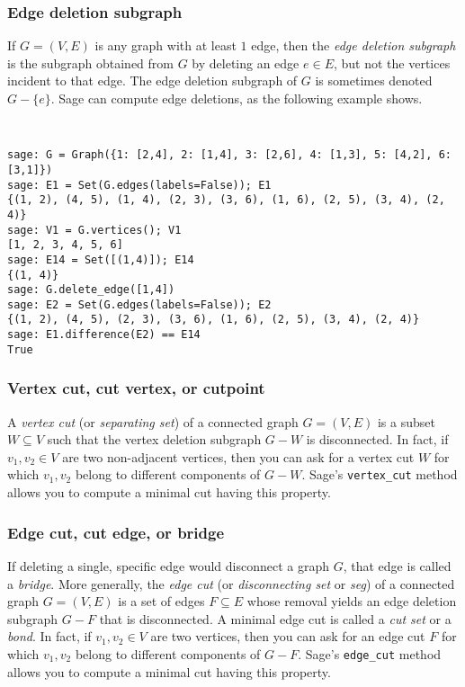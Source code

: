 \subsubsection{Edge deletion subgraph}

If $G = (V,E)$ is any graph with at least $1$ edge, then the
\emph{edge deletion subgraph} is the subgraph obtained from $G$ by
deleting an edge $e \in E$, but not the vertices incident to that edge.
The edge deletion subgraph of $G$ is sometimes denoted $G - \{e\}$.
Sage can compute edge deletions, as the following example shows.
%
\begin{center}
\fontsize{9pt}{9pt}
\selectfont
\tt
\begin{lstlisting}
sage: G = Graph({1: [2,4], 2: [1,4], 3: [2,6], 4: [1,3], 5: [4,2], 6: [3,1]})
sage: E1 = Set(G.edges(labels=False)); E1
{(1, 2), (4, 5), (1, 4), (2, 3), (3, 6), (1, 6), (2, 5), (3, 4), (2, 4)}
sage: V1 = G.vertices(); V1
[1, 2, 3, 4, 5, 6]
sage: E14 = Set([(1,4)]); E14
{(1, 4)}
sage: G.delete_edge([1,4])
sage: E2 = Set(G.edges(labels=False)); E2
{(1, 2), (4, 5), (2, 3), (3, 6), (1, 6), (2, 5), (3, 4), (2, 4)}
sage: E1.difference(E2) == E14
True
\end{lstlisting}
\end{center}


\subsubsection{Vertex cut, cut vertex, or cutpoint}

A \emph{vertex cut} (or \emph{separating set}) of a connected graph
$G = (V, E)$ is a subset $W \subseteq V$ such that the vertex deletion
subgraph $G - W$ is disconnected.
In fact, if $v_1, v_2 \in V$ are two non-adjacent vertices, then you
can ask for a vertex cut $W$ for which $v_1, v_2$ belong to different
components of $G - W$. Sage's \verb!vertex_cut! method allows you to
compute a minimal cut having this property.


\subsubsection{Edge cut, cut edge, or bridge}

If deleting a single, specific edge would disconnect a graph $G$, that
edge is called a \emph{bridge}. More generally, the \emph{edge cut}
(or \emph{disconnecting set} or \emph{seg}) of a connected graph
$G = (V, E)$ is a set of edges $F \subseteq E$ whose removal yields an
edge deletion subgraph $G - F$ that is disconnected. A minimal edge
cut is called a \emph{cut set} or a \emph{bond}.
In fact, if $v_1, v_2 \in V$ are two vertices, then you can ask for an
edge cut $F$ for which $v_1, v_2$ belong to different components of
$G - F$. Sage's \verb!edge_cut! method allows you to compute a minimal
cut having this property.

